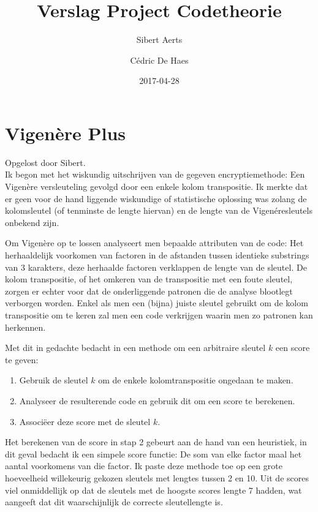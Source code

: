 \documentclass[fleqn]{article}
\title{Verslag Project Codetheorie}
\date{2017-04-28}
\author{Sibert Aerts \and C\'{e}dric De Haes}
\begin{document}
	\maketitle
	
	\section{Vigen\`ere Plus}
	Opgelost door Sibert.\\
	Ik begon met het wiskundig uitschrijven van de gegeven encryptiemethode: Een Vigen\`ere versleuteling gevolgd door een enkele kolom transpositie. Ik merkte dat er geen voor de hand liggende wiskundige of statistische oplossing was zolang de kolomsleutel (of tenminste de lengte hiervan) en de lengte van de Vigen\'eresleutels onbekend zijn.
	
	Om Vigen\`ere op te lossen analyseert men bepaalde attributen van de code: Het herhaaldelijk voorkomen van factoren in de afstanden tussen identieke substrings van 3 karakters, deze herhaalde factoren verklappen de lengte van de sleutel. De kolom transpositie, of het omkeren van de transpositie met een foute sleutel, zorgen er echter voor dat de onderliggende patronen die de analyse blootlegt verborgen worden. Enkel als men een (bijna) juiste sleutel gebruikt om de kolom transpositie om te keren zal men een code verkrijgen waarin men zo patronen kan herkennen.
	
	Met dit in gedachte bedacht in een methode om een arbitraire sleutel $k$ een score te geven:
	\begin{enumerate}
		\setlength\itemsep{0pt}
		\item Gebruik de sleutel $k$ om de enkele kolomtranspositie ongedaan te maken.
		\item Analyseer de resulterende code en gebruik dit om een score te berekenen.
		\item Associ\"eer deze score met de sleutel $k$.
	\end{enumerate}
	Het berekenen van de score in stap 2 gebeurt aan de hand van een heuristiek, in dit geval bedacht ik een simpele score functie: De som van elke factor maal het aantal voorkomens van die factor. Ik paste deze methode toe op een grote hoeveelheid willekeurig gekozen sleutels met lengtes tussen 2 en 10. Uit de scores viel onmiddellijk op dat de sleutels met de hoogste scores lengte 7 hadden, wat aangeeft dat dit waarschijnlijk de correcte sleutellengte is.
	
\end{document}
